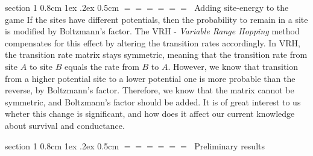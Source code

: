 \documentclass[onecolumn,fleqn,notitlepage,secnumarabic]{revtex4}
\makeatletter
\def\section{%
  \@startsection
    {section}%
    {1}%
    {\z@}%
    {0.8cm \@plus1ex \@minus .2ex}%
    {0.5cm}%
    {\Large\bf $=\!=\!=\!=\!=\!=\;$}%
}%
\makeatother
\begin{document}
\section{Adding site-energy to the game} \label{sec:vrh}
If the sites have different potentials, then the probability to remain in a site is modified by Boltzmann's factor. The VRH - \emph{Variable Range Hopping} method compensates for this effect by altering the transition rates accordingly. In VRH, the transition rate matrix stays symmetric, meaning that the transition rate from site $A$ to site $B$ equals the rate from $B$ to $A$. However, we know that transition from a higher potential site to a lower potential one is more probable than the reverse, by Boltzmann's factor. Therefore, we know that the matrix cannot be symmetric, and Boltzmann's factor should be added. It is of great interest to us wheter this change is significant, and how does it affect our current knowledge about survival and conductance.

\section{Preliminary results}

%

\end{document}
